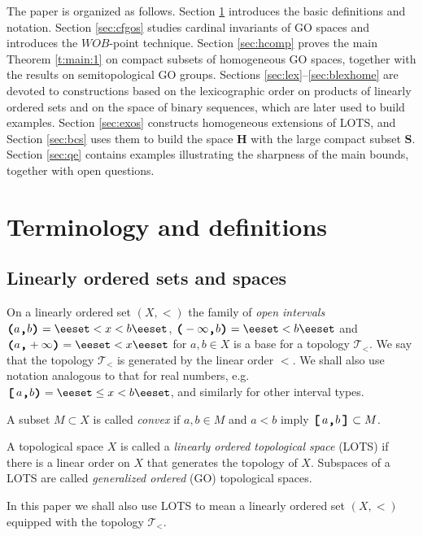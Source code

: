 \documentclass[preprint]{elsarticle}
\def\Tau{{\mathcal T}}
\def\set#1{\bbset#1\eeset}
\def\bbset#1:#2\eeset{\{#1\,:\,#2\}}
\def\tp{\Tau}
\def\term#1{{\it #1}}
\theoremstyle{definition}
\theoremstyle{remark}
\def\wob/{$WOB$}
\def\ilcomma/{\boldsymbol{,}}
\def\ilsymlp{\boldsymbol{(}}
\def\ilsymrp{\boldsymbol{)}}
\def\ilsymlc{\boldsymbol{[}}
\def\ilsymrc{\boldsymbol{]}}
\def\ilfont#1{\boldsymbol{#1}}
\def\ilfontX#1{\mathrm{\text{\texttt{\textbf{\large #1}}}}}
\def\ilfontX#1{{\text{\texttt{\textbf{\large \upshape #1}}}}}
\def\ilfont#1{\raisebox{-1.2pt}{\ilfontX{#1}}}
\def\ilfontC#1{\raisebox{-0.7pt}{\ilfontX{#1}}}
\def\ilcomma/{\ilfontC{,}}
\def\ilsymlp{\ilfont{(}}
\def\ilsymrp{\ilfont{)}}
\def\ilsymlc{\ilfont{[}\,}
\def\ilsymrc{\,\ilfont{]}}
\def\ilpp(#1,#2){\ilsymlp#1\ilcomma/ #2\ilsymrp}
\def\ilcp[#1,#2){\ilsymlc#1\ilcomma/ #2\ilsymrp}
\def\ilpc(#1,#2]{\ilsymlp#1\ilcomma/ #2\ilsymrc}
\def\ilcc[#1,#2]{\ilsymlc#1\ilcomma/ #2\ilsymrc}
\def\sS{\mathbf{S}}
\def\Hs{\mathbf{H}}
\begin{document}
The paper is organized as follows. Section \ref{sec:defs} introduces the basic definitions and notation. Section \ref{sec:cfgos} studies cardinal invariants of GO spaces and introduces the \wob/-point technique. Section \ref{sec:hcomp} proves the main Theorem \ref{t:main:1} on compact subsets of homogeneous GO spaces, together with the results on semitopological GO groups. Sections \ref{sec:lex}--\ref{sec:blexhome} are devoted to constructions based on the lexicographic order on products of linearly ordered sets and on the space of binary sequences, which are later used to build examples. Section \ref{sec:exos} constructs homogeneous extensions of LOTS, and Section \ref{sec:bcs} uses them to build the space $\Hs$ with the large compact subset $\sS$. Section \ref{sec:qe} contains examples illustrating the sharpness of the main bounds, together with open questions.


\section{Terminology and definitions} \label{sec:defs}

\subsection{Linearly ordered sets and spaces}

On a linearly ordered set $(X,<)$ the family of \term{open intervals} $\ilpp(a,b)=\set{x\in X: a<x<b}$, $\ilpp(-\infty,b)=\set{x\in X: x<b}$ and $\ilpp(a,+\infty)=\set{x\in X: a<x}$ for $a,b\in X$ is a base for a topology $\tp_{<}$. We say that the topology $\tp_{<}$ is generated by the linear order $<$.
We shall also use notation analogous to that for real numbers, e.g. $\ilcp[a,b)=\set{x\in X: a\leq x <b}$, and similarly for other interval types.

A subset $M\subset X$ is called \term{convex} if $a,b\in M$ and $a<b$ imply $\ilcc[a,b]\subset M$.

A topological space $X$ is called a \term{linearly ordered topological space} (LOTS) if there is a linear order on $X$ that generates the topology of $X$.
Subspaces of a LOTS are called \term{generalized ordered} (GO) topological spaces.

In this paper we shall also use LOTS to mean a linearly ordered set $(X,<)$ equipped with the topology $\tp_<$.
\end{document}

